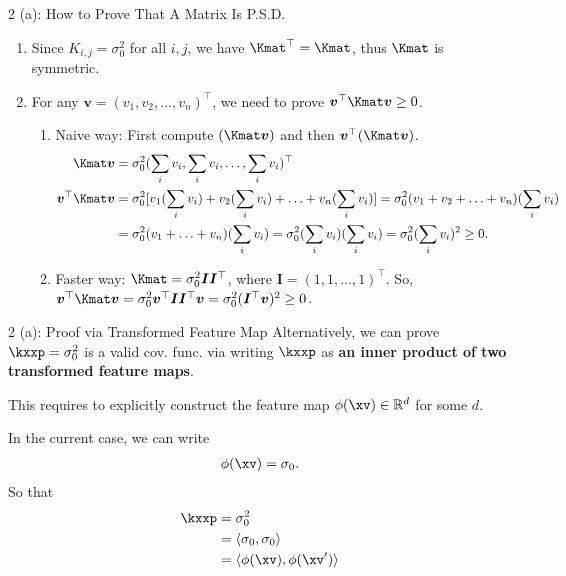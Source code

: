 \documentclass[aspectratio=169]{beamer}
\newcommand{\xvp}{\xv^\prime}
\newcommand{\Imat}{\bm{I}}
\newcommand{\Kij}{K_{i,j}}
\newcommand{\vv}{\bm{v}}
\begin{document}
\begin{frame}{2 (a): How to Prove That A Matrix Is P.S.D.}
\small
	\begin{enumerate}
		\item<1-> Since $\Kij = \sigma_0^2$ for all $i,j$, we have $\Kmat^\top = \Kmat$, thus $\Kmat$ is symmetric.
		\item<2-> For any $\vv = (v_1, v_2, \ldots, v_n)^\top$, we need to prove $ \vv^\top \Kmat \vv \geq 0$.
		\begin{enumerate}
			\item<3-> Naive way: First compute $(\Kmat \vv)$ and then $\vv^\top (\Kmat \vv)$. 
			\begin{align*}
				\Kmat \vv &= \sigma_0^2(\sum_i v_i, \sum_i v_i, \ldots, \sum_i v_i )^\top \\
				\vv^\top \Kmat \vv &= \sigma_0^2 [v_1 (\sum_i v_i) + v_2 (\sum_i v_i) + \ldots + v_n (\sum_i v_i)] = \sigma_0^2(v_1 + v_2 + \ldots + v_n) (\sum_i v_i) \\
				&= \sigma_0^2 (v_1 + \ldots + v_n) (\sum_i v_i) = \sigma_0^2 (\sum_i v_i) (\sum_i v_i) = \sigma_0^2 (\sum_i v_i)^2 \geq 0.
			\end{align*}
			\item<4-> Faster way: $\Kmat = \sigma_0^2\Imat \Imat^\top$, where $\Imat = (1, 1, \ldots, 1)^\top$. So, $\vv^\top \Kmat \vv = \sigma_0^2 \vv^\top \Imat \Imat^\top \vv = \sigma_0^2 (\Imat^\top \vv)^2 \geq 0$.
		\end{enumerate}
	\end{enumerate}
\end{frame}

\begin{frame}{2 (a): Proof via Transformed Feature Map}
	Alternatively, we can prove $\kxxp = \sigma_0^2$ is a valid cov. func. via writing $\kxxp$ as \textbf{an inner product of two transformed feature maps}.
	
	This requires to explicitly construct the feature map $\phi(\xv) \in \mathbb{R}^d$ for some $d$.
	
	In the current case, we can write 
	\begin{align*}
		\phi(\xv) = \sigma_0.
	\end{align*}
	So that 
	\begin{align*}
		\kxxp & = \sigma_0^2 \\
		&= \langle \sigma_0, \sigma_0 \rangle \\
		&= \langle \phi(\xv), \phi(\xvp) \rangle  \\
	\end{align*}
\end{frame}
\end{document}
